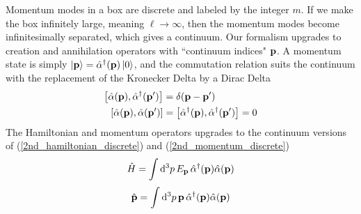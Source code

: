 Momentum modes in a box are discrete and labeled by the integer $m$. If we make the box infinitely large, meaning $\ell\to\infty$, then the momentum modes become infinitesimally separated, which gives a continuum. Our formalism upgrades to creation and annihilation operators with
``continuum indices" $\vb{p}$. A momentum state is simply $\ket{\vb{p}}=\hat{\alpha}^\dagger(\vb{p})\ket{0}$, and the commutation relation suits the continuum with the replacement of the Kronecker Delta by a Dirac Delta
\begin{equation}
\begin{aligned}
    \comm{\hat{\alpha}(\vb{p})}{\hat{\alpha}^\dagger(\vb{p}^\prime)} &=\delta(\vb{p}-\vb{p}^\prime)\\
    \comm{\hat{\alpha}(\vb{p})}{\hat{\alpha}(\vb{p}^\prime)} &=\comm{\hat{\alpha}^\dagger(\vb{p})}{\hat{\alpha}^\dagger(\vb{p}^\prime)}=0
    \label{commu_alpha}
\end{aligned}
\end{equation}
The Hamiltonian  and momentum operators upgrades to the continuum versions of (\ref{2nd_hamiltonian_discrete}) and (\ref{2nd_momentum_discrete})
\begin{equation}
    \hat{H}=\int\dd^3p\, E_{\vb{p}}\,\hat{\alpha}^\dagger(\vb{p})\hat{\alpha}(\vb{p})
    \label{2nd_hamiltonian_continuum}
\end{equation}
\begin{equation}
    \hat{\vb{p}}=\int\dd^3p\, \vb{p}\,\hat{\alpha}^\dagger(\vb{p})\hat{\alpha}(\vb{p})
    \label{2nd_momentum_continuum}
\end{equation}

